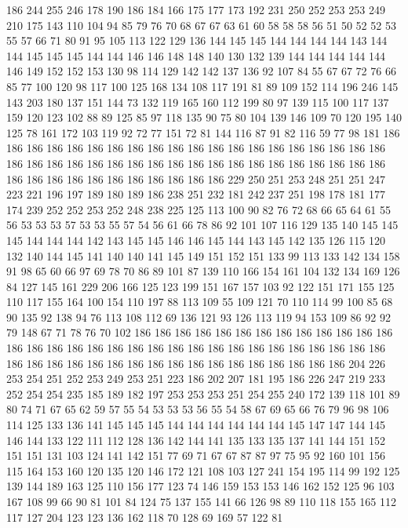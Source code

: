 186 244 255 246 178 190 186 184 166 175 177 173 192 231 250 252 253 253 249 210
175 143 110 104 94 85 79 76 70 68 67 67 63 61 60 58 58 58 56 51
50 52 52 53 55 57 66 71 80 91 95 105 113 122 129 136 144 145 145 144
144 144 144 143 144 144 145 145 145 144 144 146 146 148 148 140 130 132 139 144
144 144 144 144 146 149 152 152 153 130 98 114 129 142 142 137 136 92 107 84
55 67 67 72 76 66 85 77 100 120 98 117 100 125 168 134 108 117 191 81
89 109 152 114 196 246 145 143 203 180 137 151 144 73 132 119 165 160 112 199
80 97 139 115 100 117 137 159 120 123 102 88 89 125 85 97 118 135 90 75
80 104 139 146 109 70 120 195 140 125 78 161 172 103 119 92 72 77 151 72
81 144 116 87 91 82 116 59 77 98 181 186 186 186 186 186 186 186 186 186
186 186 186 186 186 186 186 186 186 186 186 186 186 186 186 186 186 186 186 186
186 186 186 186 186 186 186 186 186 186 186 186 186 186 186 186 186 186 186 186
186 229 250 251 253 248 251 251 247 223 221 196 197 189 180 189 186 238 251 232
181 242 237 251 198 178 181 177 174 239 252 252 253 252 248 238 225 125 113 100
90 82 76 72 68 66 65 64 61 55 56 53 53 53 57 53 53 55 57 54
56 61 66 78 86 92 101 107 116 129 135 140 145 145 145 144 144 144 142 143
145 145 146 146 145 144 143 145 142 135 126 115 120 132 140 144 145 141 140 140
141 145 149 151 152 151 133 99 113 133 142 134 158 91 98 65 60 66 97 69
78 70 86 89 101 87 139 110 166 154 161 104 132 134 169 126 84 127 145 161
229 206 166 125 123 199 151 167 157 103 92 122 151 171 155 125 110 117 155 164
100 154 110 197 88 113 109 55 109 121 70 110 114 99 100 85 68 90 135 92
138 94 76 113 108 112 69 136 121 93 126 113 119 94 153 109 86 92 92 79
148 67 71 78 76 70 102 186 186 186 186 186 186 186 186 186 186 186 186 186
186 186 186 186 186 186 186 186 186 186 186 186 186 186 186 186 186 186 186 186
186 186 186 186 186 186 186 186 186 186 186 186 186 186 186 186 204 226 253 254
251 252 253 249 253 251 223 186 202 207 181 195 186 226 247 219 233 252 254 254
235 185 189 182 197 253 253 253 251 254 255 240 172 139 118 101 89 80 74 71
67 65 62 59 57 55 54 53 53 53 56 55 54 58 67 69 65 66 76 79
96 98 106 114 125 133 136 141 145 145 145 144 144 144 144 144 144 145 147 147
144 145 146 144 133 122 111 112 128 136 142 144 141 135 133 135 137 141 144 151
152 151 151 131 103 124 141 142 151 77 69 71 67 67 87 87 97 75 95 92
160 101 156 115 164 153 160 120 135 120 146 172 121 108 103 127 241 154 195 114
99 192 125 139 144 189 163 125 110 156 177 123 74 146 159 153 153 146 162 152
125 96 103 167 108 99 66 90 81 101 84 124 75 137 155 141 66 126 98 89
110 118 155 165 112 117 127 204 123 123 136 162 118 70 128 69 169 57 122 81

